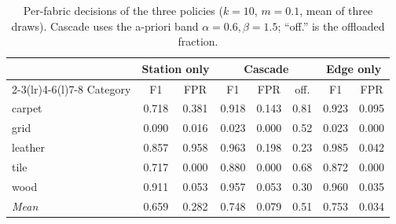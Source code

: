 \begin{table}[t]
\centering
\caption{Per-fabric decisions of the three policies ($k=10$, $m=0.1$, mean of three draws). Cascade uses the a-priori band $\alpha=0.6,\beta=1.5$; ``off.'' is the offloaded fraction.}
\label{tab:gate}
\footnotesize
\setlength{\tabcolsep}{3.5pt}
\begin{tabular}{@{}lccccccc@{}}
\toprule
& \multicolumn{2}{c}{Station only} & \multicolumn{3}{c}{Cascade} & \multicolumn{2}{c}{Edge only} \\
\cmidrule(lr){2-3}\cmidrule(lr){4-6}\cmidrule(l){7-8}
Category & F1 & FPR & F1 & FPR & off. & F1 & FPR \\
\midrule
carpet & 0.718 & 0.381 & 0.918 & 0.143 & 0.81 & 0.923 & 0.095 \\
grid & 0.090 & 0.016 & 0.023 & 0.000 & 0.52 & 0.023 & 0.000 \\
leather & 0.857 & 0.958 & 0.963 & 0.198 & 0.23 & 0.985 & 0.042 \\
tile & 0.717 & 0.000 & 0.880 & 0.000 & 0.68 & 0.872 & 0.000 \\
wood & 0.911 & 0.053 & 0.957 & 0.053 & 0.30 & 0.960 & 0.035 \\ \midrule
\textit{Mean} & 0.659 & 0.282 & 0.748 & 0.079 & 0.51 & 0.753 & 0.034 \\
\bottomrule
\end{tabular}
\end{table}
